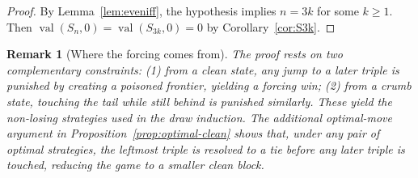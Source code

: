 \documentclass[11pt]{article}
\newtheorem{remark}[theorem]{Remark}
\newcommand{\val}{\operatorname{val}}
\begin{document}
\begin{proof}
By Lemma~\ref{lem:eveniff}, the hypothesis implies $n=3k$ for some $k\ge 1$.
Then $\val(S_n,0)=\val(S_{3k},0)=0$ by Corollary~\ref{cor:S3k}.
\end{proof}

\begin{remark}[Where the forcing comes from]
The proof rests on two complementary constraints:
(1) from a clean state, any jump to a later triple is punished by creating a poisoned frontier, yielding a forcing win;
(2) from a crumb state, touching the tail while still behind is punished similarly.
These yield the non-losing strategies used in the draw induction. The additional optimal-move
argument in Proposition~\ref{prop:optimal-clean} shows that, under any pair of optimal strategies,
the leftmost triple is resolved to a tie before any later triple is touched, reducing the game
to a smaller clean block.
\end{remark}
\end{document}
